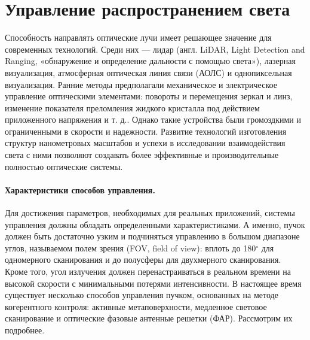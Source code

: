 \section{Управление распространением света}
Способность направлять оптические лучи имеет решающее значение для современных технологий. Среди них — лидар (англ. LiDAR, Light Detection and Ranging, «обнаружение и определение дальности с помощью света»)\cite{jaboyedoff2012use}, лазерная визуализация\cite{holmstrom2014mems}, атмосферная оптическая линия связи (АОЛС)\cite{khalighi2014survey} и однопиксельная визуализация\cite{edgar2019principles}. Ранние методы предполагали механическое и электрическое управление оптическими элементами: повороты и перемещения зеркал и линз, изменение показателя преломления жидкого кристалла под действием приложенного напряжения и т. д.\cite{tholl2006novel}. Однако такие устройства были громоздкими и ограниченными в скорости и надежности. Развитие технологий изготовления структур нанометровых масштабов и успехи в исследовании взаимодействия света с ними позволяют создавать более эффективные и производительные полностью оптические системы.

\paragraph*{Характеристики способов управления.}
Для достижения параметров, необходимых для реальных приложений, системы управления должны обладать определенными характеристиками. А именно, пучок должен быть достаточно узким и подчиняться управлению в большом диапазоне углов, называемом полем зрения (FOV, field of view): вплоть до 180$^\circ$ для одномерного сканирования и до полусферы для двухмерного сканирования. Кроме того, угол излучения должен перенастраиваться в реальном времени на высокой скорости с минимальными потерями интенсивности. В настоящее время существует несколько способов управления пучком, основанных на методе когерентного контроля: активные метаповерхности, медленное световое сканирование и оптические фазовые антенные решетки (ФАР). Рассмотрим их подробнее.


